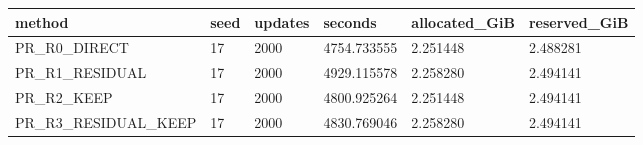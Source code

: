\begin{tabular}{llllll}
\toprule
method & seed & updates & seconds & allocated\_GiB & reserved\_GiB \\
\midrule
PR\_R0\_DIRECT & 17 & 2000 & 4754.733555 & 2.251448 & 2.488281 \\
PR\_R1\_RESIDUAL & 17 & 2000 & 4929.115578 & 2.258280 & 2.494141 \\
PR\_R2\_KEEP & 17 & 2000 & 4800.925264 & 2.251448 & 2.494141 \\
PR\_R3\_RESIDUAL\_KEEP & 17 & 2000 & 4830.769046 & 2.258280 & 2.494141 \\
\bottomrule
\end{tabular}
